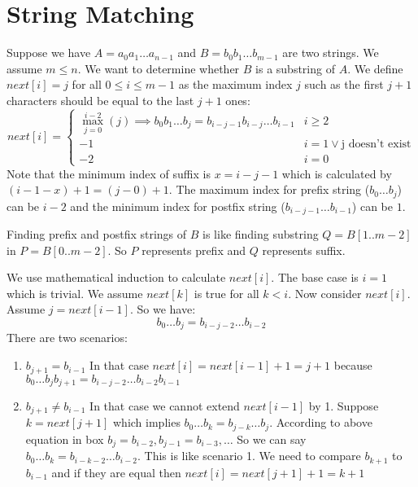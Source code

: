 \documentclass{book}
\begin{document}
	\section{String Matching}
	Suppose we have $A = a_0 a_1 \dots a_{n - 1}$ and $B = b_0 b_1 \dots b_{m - 1}$ are two strings. We assume $m \le n$. We want to determine whether $B$ is a substring of $A$. We define $next[i] = j$ for all $0 \le i \le m - 1$ as the maximum index $j$ such as the first $j + 1$ characters should be equal to the last $j + 1$ ones:
	\begin{equation*}
		next[i] = \begin{cases}
			\max\limits_{j = 0}^{i - 2}{(j)} \implies b_0 b_1 \dots b_j = b_{i - j - 1} b_{i - j} \dots b_{i - 1} & i \ge 2 \\
			-1 & i = 1 \lor \text{j doesn't exist} \\
			-2 & i = 0
		\end{cases}
	\end{equation*}
	Note that the minimum index of suffix is $x = i - j - 1$ which is calculated by $(i - 1 - x) + 1 = (j - 0) + 1$. The maximum index for prefix string ($b_0 \dots b_j$) can be $i - 2$ and the minimum index for postfix string ($b_{i - j - 1} \dots b_{i - 1}$) can be $1$.
	\par Finding prefix and postfix strings of $B$ is like finding substring $Q = B[1..m - 2]$ in $P = B[0..m-2]$. So $P$ represents prefix and $Q$ represents suffix.
	\par We use mathematical induction to calculate $next[i]$. The base case is $i = 1$ which is trivial. We assume $next[k]$ is true for all $k < i$. Now consider $next[i]$. Assume $j = next[i - 1]$. So we have:
	\begin{equation*}
		\boxed{
		b_0 \dots b_j = b_{i - j - 2} \dots b_{i - 2}
		}
	\end{equation*}
	There are two scenarios:
	\begin{enumerate}
		\item $b_{j + 1} = b_{i - 1}$ In that case $next[i] = next[i - 1] + 1 = j + 1$ because $b_0 \dots b_j b_{j + 1} = b_{i - j - 2} \dots b_{i - 2} b_{i - 1}$
		\item $b_{j + 1} \ne b_{i - 1}$ In that case we cannot extend $next[i - 1]$ by 1. Suppose $k = next[j + 1]$ which implies $b_0 \dots b_k = b_{j - k} \dots b_j$. According to above equation in box $b_j = b_{i - 2}, b_{j - 1} = b_{i - 3}, \dots$ So we can say $b_0 \dots b_k = b_{i - k - 2} \dots b_{i - 2}$. This is like scenario 1. We need to compare $b_{k + 1}$ to $b_{i - 1}$ and if they are equal then $next[i] = next[j + 1] + 1 = k + 1$		
	\end{enumerate}
\end{document}
